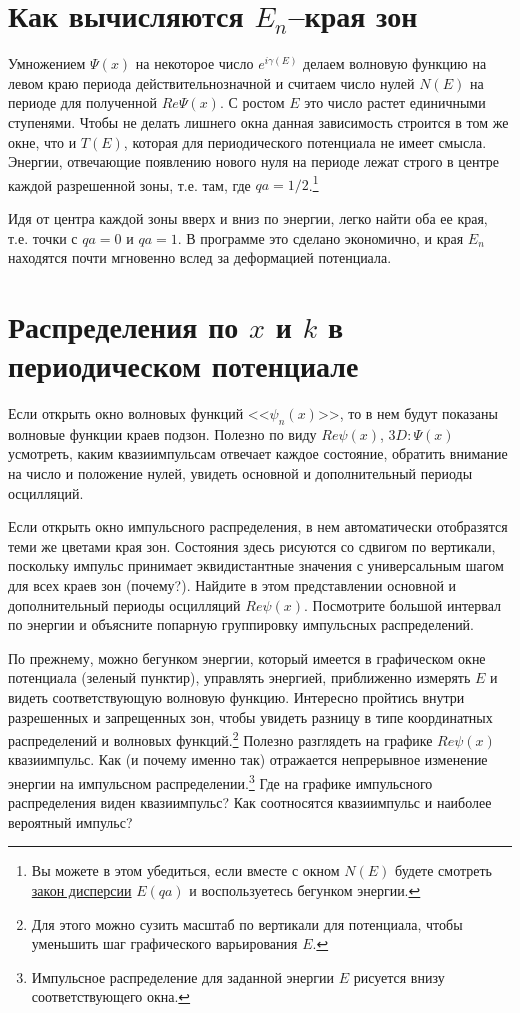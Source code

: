 \documentclass[12pt]{article}
\begin{document}
\hypertarget{band_edge}{}\section[Как вычисляются края зон]{Как вычисляются $E_n$--края зон}
Умножением $\Psi(x)$ на некоторое число $e^{i\gamma(E)}$
делаем волновую функцию на левом краю периода действительнозначной и считаем число нулей $N(E)$ на периоде
для полученной $Re\Psi(x)$. С ростом $E$ это число растет единичными ступенями. Чтобы не делать лишнего окна данная зависимость строится в том же окне, что и $T(E)$, которая для периодического потенциала не имеет смысла. Энергии, отвечающие появлению нового нуля на периоде лежат строго в центре каждой разрешенной зоны, т.е. там, где $qa=1/2$.\footnote[13] {Вы можете в этом убедиться, если вместе с окном $N(E)$ будете смотреть \hyperlink {qaOfE}{закон дисперсии} $E(qa)$ и воспользуетесь бегунком энергии.}

Идя от центра каждой зоны вверх и вниз по энергии, легко найти оба ее края, т.е. точки с $qa=0$ и $qa=1$.
В программе это сделано экономично, и края $E_n$ находятся почти мгновенно вслед за деформацией потенциала.


\hypertarget{Psi_per}{}\section[Координатные и импульсные распределения в периодическом потенциале]{Распределения по $x$ и $k$ в периодическом потенциале}
Если открыть окно волновых функций <<$\psi_n(x)$>>, то в нем будут показаны волновые функции краев подзон.
Полезно по виду $Re \psi(x)$, $3D:\Psi(x)$ усмотреть, каким квазиимпульсам отвечает каждое состояние, обратить внимание на
число и положение нулей, увидеть основной и дополнительный периоды осцилляций.

Если  открыть окно импульсного распределения, в нем автоматически отобразятся теми же цветами края зон. Состояния здесь рисуются
со сдвигом по вертикали, поскольку импульс принимает эквидистантные значения с универсальным шагом для всех краев
зон (почему?). Найдите в этом представлении основной и дополнительный периоды осцилляций $Re \psi(x)$. Посмотрите
большой интервал по энергии и объясните попарную группировку импульсных распределений.

По прежнему, можно бегунком энергии, который имеется в графическом окне потенциала (зеленый пунктир), управлять
энергией, приближенно измерять $E$ и видеть соответствующую волновую функцию. Интересно пройтись внутри разрешенных
и запрещенных зон, чтобы  увидеть разницу в типе координатных распределений и волновых функций.\footnote[14] {Для этого можно
сузить масштаб по вертикали для потенциала, чтобы уменьшить шаг графического варьирования $E$.} Полезно разглядеть
на графике $Re \psi(x)$ квазиимпульс. Как (и почему именно так) отражается непрерывное изменение энергии на
импульсном распределении.\footnote[15] {Импульсное распределение для заданной энергии $E$ рисуется внизу соответствующего окна.} Где на графике импульсного распределения виден квазиимпульс?
Как соотносятся квазиимпульс и наиболее вероятный импульс?
\end{document}
